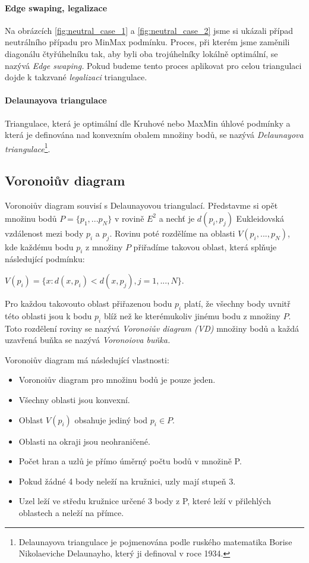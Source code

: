 \documentclass[12pt,a4paper]{article}
\begin{document}
{\paragraph{Edge swaping, legalizace}

Na obrázcích \ref{fig:neutral_case_1} a \ref{fig:neutral_case_2} jsme
si ukázali případ neutrálního případu pro MinMax podmínku. Proces, při
kterém jsme zaměnili diagonálu čtyřúhelníku tak, aby byli oba
trojúhelníky lokálně optimální, se nazývá \emph{Edge swaping.} Pokud
budeme tento proces aplikovat pro celou triangulaci dojde k takzvané
\emph{legalizaci} triangulace.

\paragraph{Delaunayova triangulace}

Triangulace, která je optimální dle Kruhové nebo MaxMin úhlové
podmínky a která je definována nad konvexním obalem množiny bodů, se
nazývá \emph{Delaunayova triangulace}\footnote{Delaunayova triangulace
  je pojmenována podle ruského matematika Borise Nikolaeviche
  Delaunayho\cite{Delaunay}, který ji definoval v roce 1934.}.

\newpage
\subsection{Voronoiův diagram}

Voronoiův diagram souvisí s Delaunayovou triangulací. Představme si
opět množinu bodů $P = \{p_1,...p_N\} $ v rovině $E^2$ a nechť je
$d(p_i,p_j) $ Eukleidovská vzdálenost mezi body $p_i$ a $p_j$. Rovinu
poté rozdělíme na oblasti $V(p_i,...,p_N)$, kde každému bodu $p_i$ z
množiny $P$ přiřadíme takovou oblast, která splňuje následující
podmínku:

$V(p_i) = \{ x: d(x, p_i) < d(x, p_j), j = 1,...,N\}$.

Pro každou takovouto oblast přiřazenou bodu $p_i$ platí, že
všechny body uvnitř této oblasti jsou k bodu $p_i$ blíž než ke
kterémukoliv jinému bodu z množiny $P$. Toto rozdělení roviny se
nazývá \emph{Voronoiův diagram (VD)} množiny bodů a každá uzavřená
buňka se nazývá \emph{Voronoiova buňka.}

\bigskip
Voronoiův diagram má následující vlastnosti: 
\begin{itemize}
\item Voronoiův diagram pro množinu bodů je pouze jeden.
\item Všechny oblasti jsou konvexní.
\item Oblast $V(p_i)$ obsahuje jediný bod $p_i \in P$.
\item Oblasti na okraji jsou neohraničené.
\item Počet hran a uzlů je přímo úměrný počtu bodů v množině P.
\item Pokud žádné 4 body neleží na kružnici, uzly mají stupeň 3.
\item Uzel leží ve středu kružnice určené 3 body z P, které leží v přilehlých oblastech a neleží na přímce.
\end{itemize}

}
\end{document}

